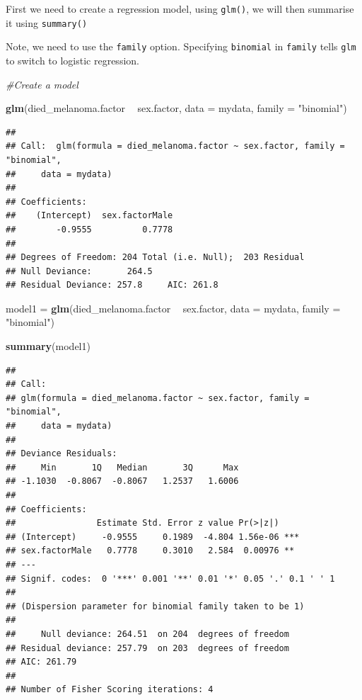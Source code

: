 \documentclass[]{book}
\makeatletter
\newenvironment{Shaded}{\begin{snugshade}}{\end{snugshade}}
\newcommand{\KeywordTok}[1]{\textcolor[rgb]{0.13,0.29,0.53}{\textbf{#1}}}
\newcommand{\DataTypeTok}[1]{\textcolor[rgb]{0.13,0.29,0.53}{#1}}
\newcommand{\StringTok}[1]{\textcolor[rgb]{0.31,0.60,0.02}{#1}}
\newcommand{\CommentTok}[1]{\textcolor[rgb]{0.56,0.35,0.01}{\textit{#1}}}
\newcommand{\OperatorTok}[1]{\textcolor[rgb]{0.81,0.36,0.00}{\textbf{#1}}}
\newcommand{\NormalTok}[1]{#1}
\newenvironment{kframe}{%
\medskip{}
\setlength{\fboxsep}{.8em}
 \def\at@end@of@kframe{}%
 \ifinner\ifhmode%
  \def\at@end@of@kframe{\end{minipage}}%
  \begin{minipage}{\columnwidth}%
 \fi\fi%
 \def\FrameCommand##1{\hskip\@totalleftmargin \hskip-\fboxsep
 \colorbox{shadecolor}{##1}\hskip-\fboxsep
     \hskip-\linewidth \hskip-\@totalleftmargin \hskip\columnwidth}%
 \MakeFramed {\advance\hsize-\width
   \@totalleftmargin\z@ \linewidth\hsize
   \@setminipage}}%
 {\par\unskip\endMakeFramed%
 \at@end@of@kframe}
\renewenvironment{Shaded}{\begin{kframe}}{\end{kframe}}
\makeatother
\begin{document}
First we need to create a regression model, using \texttt{glm()}, we
will then summarise it using \texttt{summary()}

Note, we need to use the \texttt{family} option. Specifying
\texttt{\textquotesingle{}binomial\textquotesingle{}} in \texttt{family}
tells \texttt{glm} to switch to logistic regression.

\begin{Shaded}
\begin{Highlighting}[]
\CommentTok{#Create a model}

\KeywordTok{glm}\NormalTok{(died_melanoma.factor }\OperatorTok{~}\StringTok{ }\NormalTok{sex.factor, }\DataTypeTok{data =}\NormalTok{ mydata, }\DataTypeTok{family =} \StringTok{"binomial"}\NormalTok{)}
\end{Highlighting}
\end{Shaded}

\begin{verbatim}
## 
## Call:  glm(formula = died_melanoma.factor ~ sex.factor, family = "binomial", 
##     data = mydata)
## 
## Coefficients:
##    (Intercept)  sex.factorMale  
##        -0.9555          0.7778  
## 
## Degrees of Freedom: 204 Total (i.e. Null);  203 Residual
## Null Deviance:       264.5 
## Residual Deviance: 257.8     AIC: 261.8
\end{verbatim}

\begin{Shaded}
\begin{Highlighting}[]
\NormalTok{model1 =}\StringTok{ }\KeywordTok{glm}\NormalTok{(died_melanoma.factor }\OperatorTok{~}\StringTok{ }\NormalTok{sex.factor, }\DataTypeTok{data =}\NormalTok{ mydata, }\DataTypeTok{family =} \StringTok{"binomial"}\NormalTok{)}

\KeywordTok{summary}\NormalTok{(model1)}
\end{Highlighting}
\end{Shaded}

\begin{verbatim}
## 
## Call:
## glm(formula = died_melanoma.factor ~ sex.factor, family = "binomial", 
##     data = mydata)
## 
## Deviance Residuals: 
##     Min       1Q   Median       3Q      Max  
## -1.1030  -0.8067  -0.8067   1.2537   1.6006  
## 
## Coefficients:
##                Estimate Std. Error z value Pr(>|z|)    
## (Intercept)     -0.9555     0.1989  -4.804 1.56e-06 ***
## sex.factorMale   0.7778     0.3010   2.584  0.00976 ** 
## ---
## Signif. codes:  0 '***' 0.001 '**' 0.01 '*' 0.05 '.' 0.1 ' ' 1
## 
## (Dispersion parameter for binomial family taken to be 1)
## 
##     Null deviance: 264.51  on 204  degrees of freedom
## Residual deviance: 257.79  on 203  degrees of freedom
## AIC: 261.79
## 
## Number of Fisher Scoring iterations: 4
\end{verbatim}
\end{document}
